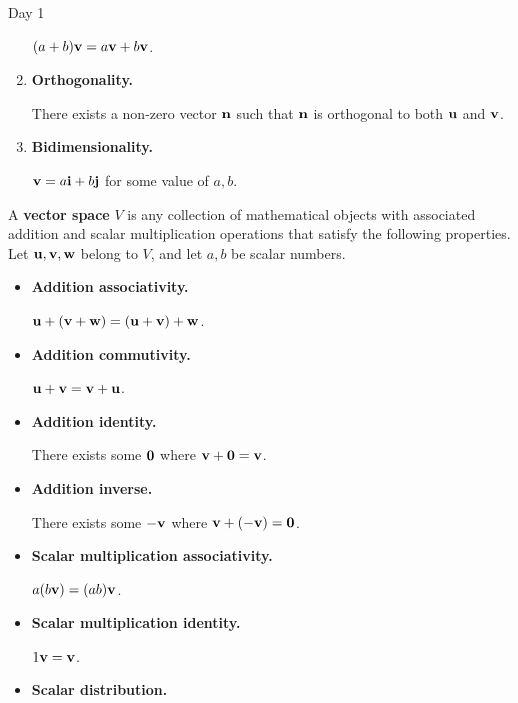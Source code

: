\begin{applicationActivities}{Day 1}
\begin{activity}{25}
\begin{multicols}{2}
\begin{enumerate}
        \((a+b)\mathbf v=a\mathbf v+b\mathbf v\).
  \item \textbf{Orthogonality.}

        There exists a non-zero vector \(\mathbf n\) such that
        \(\mathbf n\) is orthogonal to both \(\mathbf u\) and \(\mathbf v\).
  \item \textbf{Bidimensionality.}

        \(\mathbf v=a\mathbf i+b\mathbf j\) for some value of \(a,b\).
\end{enumerate}
\end{multicols}
\end{activity}

\begin{definition}
  A \textbf{vector space} \(V\) is any collection of mathematical objects with
  associated addition and scalar multiplication operations that satisfy
  the following properties. Let \(\mathbf u,\mathbf v,\mathbf w\) belong to \(V\),
  and let \(a,b\) be scalar numbers.
  \begin{multicols}{2}
  \begin{itemize}
    \item \textbf{Addition associativity.}

          \(\mathbf u+(\mathbf v+\mathbf w)=
          (\mathbf u+\mathbf v)+\mathbf w\).
    \item \textbf{Addition commutivity.}

          \(\mathbf u+\mathbf v=
          \mathbf v+\mathbf u\).
    \item \textbf{Addition identity.}

          There exists some \(\mathbf 0\)
          where \(\mathbf v+\mathbf 0=\mathbf v\).
    \item \textbf{Addition inverse.}

          There exists some \(-\mathbf v\)
          where \(\mathbf v+(-\mathbf v)=\mathbf 0\).
    \item \textbf{Scalar multiplication associativity.}

          \(a(b\mathbf v)=(ab)\mathbf v\).
    \item \textbf{Scalar multiplication identity.}

          \(1\mathbf v=\mathbf v\).
    \item \textbf{Scalar distribution.}


\end{itemize}
\end{multicols}
\end{definition}
\end{applicationActivities}
